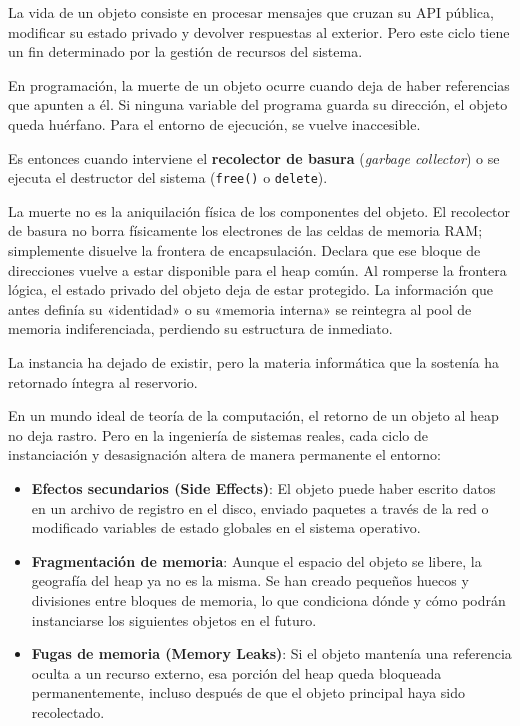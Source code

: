\noindent La vida de un objeto consiste en procesar mensajes que cruzan su API pública, modificar su estado privado y devolver respuestas al exterior. Pero este ciclo tiene un fin determinado por la gestión de recursos del sistema.

En programación, la muerte de un objeto ocurre cuando deja de haber referencias que apunten a él. Si ninguna variable del programa guarda su dirección, el objeto queda huérfano. Para el entorno de ejecución, se vuelve inaccesible.

Es entonces cuando interviene el \textbf{recolector de basura} (\emph{garbage collector}) o se ejecuta el destructor del sistema (\texttt{free()} o \texttt{delete}).

La muerte no es la aniquilación física de los componentes del objeto. El recolector de basura no borra físicamente los electrones de las celdas de memoria RAM; simplemente disuelve la frontera de encapsulación. Declara que ese bloque de direcciones vuelve a estar disponible para el heap común. Al romperse la frontera lógica, el estado privado del objeto deja de estar protegido. La información que antes definía su «identidad» o su «memoria interna» se reintegra al pool de memoria indiferenciada, perdiendo su estructura de inmediato.

La instancia ha dejado de existir, pero la materia informática que la sostenía ha retornado íntegra al reservorio.


\noindent En un mundo ideal de teoría de la computación, el retorno de un objeto al heap no deja rastro. Pero en la ingeniería de sistemas reales, cada ciclo de instanciación y desasignación altera de manera permanente el entorno:

\begin{itemize}
\item \textbf{Efectos secundarios (Side Effects)}: El objeto puede haber escrito datos en un archivo de registro en el disco, enviado paquetes a través de la red o modificado variables de estado globales en el sistema operativo.
\item \textbf{Fragmentación de memoria}: Aunque el espacio del objeto se libere, la geografía del heap ya no es la misma. Se han creado pequeños huecos y divisiones entre bloques de memoria, lo que condiciona dónde y cómo podrán instanciarse los siguientes objetos en el futuro.
\item \textbf{Fugas de memoria (Memory Leaks)}: Si el objeto mantenía una referencia oculta a un recurso externo, esa porción del heap queda bloqueada permanentemente, incluso después de que el objeto principal haya sido recolectado.
\end{itemize}

